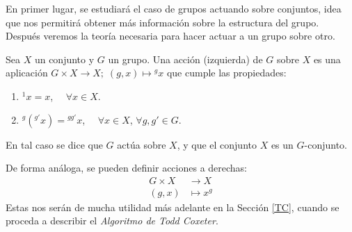 En primer lugar, se estudiará el caso de grupos actuando sobre conjuntos, idea que nos permitirá obtener más información sobre la estructura del grupo. Después veremos la teoría necesaria para hacer actuar a un grupo sobre otro.

\begin{definition} \label{prop}
    Sea $X$ un conjunto y $G$ un grupo. Una acción (izquierda) de $G$ sobre $X$ es una aplicación $G \times X \rightarrow X;  \; (g,x) \mapsto {}^{g}x$ que cumple las propiedades:
    \begin{enumerate}
        \item ${}^{1}x = x$, $\quad \forall x \in X$.\label{es1}
        \item ${}^{g}({}^{g'}x)={}^{g{g'}}x$,  $\quad \forall x \in X $, $\forall g, g' \in G$. \label{es2}
    \end{enumerate}
\end{definition}

En tal caso se dice que $G$ actúa sobre $X$, y que el conjunto $X$ es un $G$-conjunto.


De forma análoga, se pueden definir acciones a derechas:
\begin{align*}
 G \times X &\rightarrow X \\
 (g,x) &\mapsto x^g
\end{align*}
Estas nos serán de mucha utilidad más adelante en la Sección \ref{TC}, cuando se proceda a describir el \textit{Algoritmo de Todd Coxeter}.



